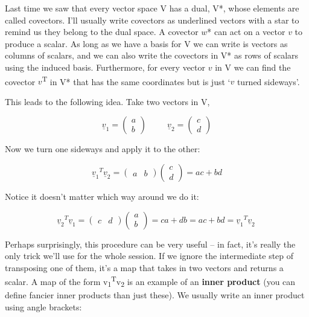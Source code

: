 \documentclass[oneside,english]{amsbook}
\numberwithin{section}{chapter}
\theoremstyle{plain}
\theoremstyle{definition}
\begin{document}
Last time we saw that every vector space V has a dual, V*, whose
elements are called covectors. I'll usually write covectors as
underlined vectors with a star to remind us they belong to the dual
space. A covector $w$* can act on a vector $v$ to produce a
scalar. As long as we have a basis for V we can write is vectors as
columns of scalars, and we can also write the covectors in V* as rows of
scalars using the induced basis. Furthermore, for every vector $v$ in
V we can find the covector $v$\textsuperscript{T} in V* that has the
same coordinates but is just `$v$ turned sideways'.

This leads to the following idea. Take two vectors in V,

\[{\underline{v}}_{1} = \begin{pmatrix}
	a \\
	b
\end{pmatrix}\ \ \ \ \ \ \ \ \ \ \ {\underline{v}}_{2} = \begin{pmatrix}
	c \\
	d
\end{pmatrix}\]

Now we turn one sideways and apply it to the other:

\[{{\underline{v}}_{1}}^{T}{\underline{v}}_{2} = \begin{pmatrix}
	a & b
\end{pmatrix}\begin{pmatrix}
	c \\
	d
\end{pmatrix} = ac + bd\]

Notice it doesn't matter which way around we do it:

\[{{\underline{v}}_{2}}^{T}{\underline{v}}_{1} = \begin{pmatrix}
	c & d
\end{pmatrix}\begin{pmatrix}
	a \\
	b
\end{pmatrix} = ca + db = ac + bd = {{\underline{v}}_{1}}^{T}{\underline{v}}_{2}\ \]

Perhaps surprisingly, this procedure can be very useful -- in fact, it's
really the only trick we'll use for the whole session. If we ignore the
intermediate step of transposing one of them, it's a map that takes in
two vectors and returns a scalar. A map of the form
v\textsubscript{1}\textsuperscript{T}v\textsubscript{2} is an example of
an \textbf{inner product} (you can define fancier inner products than
just these). We usually write an inner product using angle brackets:
\end{document}
